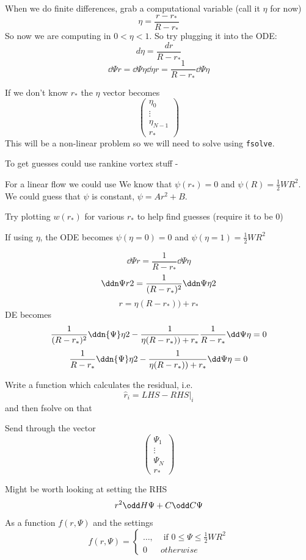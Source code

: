 \documentclass{X:/Documents/Coding/Latex/myreport}
\begin{document}






When we do finite differences, grab a computational variable (call it $\eta$ for now)
\[ \eta = \frac{r - r_*}{R-r_*}\]
So now we are computing in $0<\eta<1$.
So try plugging it into the ODE:
\[d\eta = \frac{dr}{R-r_*}\]
\[\dd\Psi r = \dd\Psi\eta \dd\eta r = \frac{1}{R-r_*} \dd\Psi\eta\]

If we don't know $r_*$ the $\eta$ vector becomes
\[\begin{pmatrix}
    \eta_0\\
    \vdots\\
    \eta_{N-1}\\
    r_*
\end{pmatrix}\]
This will be a non-linear problem so we will need to solve using \verb|fsolve|.

To get guesses could use rankine vortex stuff - 

For a linear flow we could use
We know that $\psi(r_*) = 0$ and $\psi(R) = \frac12 WR^2$. We could guess that $\psi$ is constant, $\psi = Ar^2 + B$.

Try plotting $w(r_*)$ for various $r_*$ to help find guesses (require it to be $0$)



If using $\eta$, the ODE becomes
$\psi(\eta = 0) = 0$ and $\psi(\eta=1) = \frac12 WR^2$

\[\dd \Psi r = \frac{1}{R-r_*} \dd\Psi\eta \]
\[\ddn\Psi r 2 = \frac{1}{(R-r_*)^2}\ddn\Psi\eta 2\]
\[r = \eta(R-r_*)) +r_*\]
DE becomes
\[\frac{1}{(R-r_*)^2}\ddn{\Psi}\eta2  -\frac{1}{\eta(R-r_*)) +r_*} \frac1{R-r_*}\dd\Psi \eta =0\]
\[\frac{1}{R-r_*}\ddn{\Psi}\eta2  -\frac{1}{\eta(R-r_*)) +r_*}\dd\Psi \eta =0\]



\clearpage
Write a function which calculates the residual, i.e.
\[\hat{r}_i = LHS - RHS| _i\]
and then fsolve on that

Send through the vector
\[\begin{pmatrix}
    \Psi_1\\
    \vdots\\
    \Psi_N\\
    r_*
\end{pmatrix}\]



Might be worth looking at setting the RHS
\[r^2 \odd H\Psi + C \odd C\Psi \]
As a function $f(r,\Psi)$ and the settings
\[f(r,\Psi) = \begin{cases}
    \ldots, &\text{ if } 0 \leq \Psi \leq \frac12 WR^2\\
    0 & otherwise
\end{cases}\]
\end{document}
